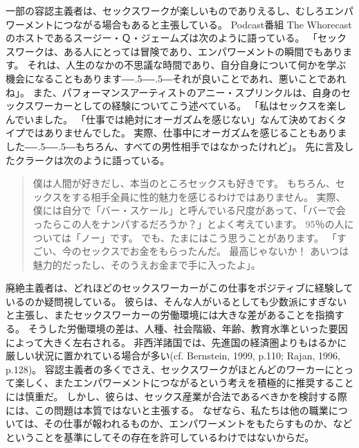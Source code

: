 \documentclass[paper=a4,book,openany]{jlreq}
\newcommand{\ig}[1]{}           %
\def\DDASH{―\kern-.5\zw―\kern-.5\zw―} %
\begin{document}
一部の容認主義者は、セックスワークが楽しいものでありえるし、むしろエンパワーメントにつながる場合もあると主張している。
Podcast番組 The Whorecast のホストであるスージー・Ｑ・ジェームズは次のように語っている。
「セックスワークは、ある人にとっては冒険であり、エンパワーメントの瞬間でもあります。
それは、人生のなかの不思議な時間であり、自分自身について何かを学ぶ機会になることもあります{\DDASH}それが良いことであれ、悪いことであれね」\citep{richardson14:_is_sex_work_empow_enslav}。
また、パフォーマンスアーティストのアニー・スプリンクルは、自身のセックスワーカーとしての経験についてこう述べている。
「私はセックスを楽しんでいました。
「仕事では絶対にオーガズムを感じない」なんて決めておくタイプではありませんでした。
実際、仕事中にオーガズムを感じることもありました{\DDASH}もちろん、すべての男性相手ではなかったけれど」\citep[pp.42-43]{bell95:_whore_carniv}。
先に言及したクラークは次のように語っている。

\begin{quote}
僕は人間が好きだし、本当のところセックスも好きです。
もちろん、セックスをする相手全員に性的魅力を感じるわけではありません。
実際、僕には自分で「バー・スケール」と呼んでいる尺度があって、「バーで会ったらこの人をナンパするだろうか？」とよく考えています。
95％の人については「ノー」です。
でも、たまにはこう思うことがあります。
「すごい、今のセックスでお金をもらったんだ。
最高じゃないか！ あいつは魅力的だったし、そのうえお金まで手に入ったよ」。
\citep[p.11]{curtis19:_we_are_naked_waitr_who_deliv_sex}
\end{quote}

廃絶主義者は、どれほどのセックスワーカーがこの仕事をポジティブに経験しているのか疑問視している。
彼らは、そんな人がいるとしても少数派にすぎないと主張し、またセックスワーカーの労働環境には大きな差があることを指摘する。
そうした労働環境の差は、人種、社会階級、年齢、教育水準といった要因によって大きく左右される。
非西洋諸国では、先進国の経済圏よりもはるかに厳しい状況に置かれている場合が多い(cf. Bernstein, 1999, p.110; Rajan, 1996, p.128)。
\ig{Elizabeth Bernstein}\nocite{bernstein99:_whats_wrong_prost}\nocite{rajan96:_prost_quest}
容認主義者の多くでさえ、セックスワークがほとんどのワーカーにとって楽しく、またエンパワーメントにつながるという考えを積極的に推奨することには慎重だ。
しかし、彼らは、セックス産業が合法であるべきかを検討する際には、この問題は本質ではないと主張する。
なぜなら、私たちは他の職業については、その仕事が報われるものか、エンパワーメントをもたらすものか、などということを基準にしてその存在を許可しているわけではないからだ。
\end{document}
